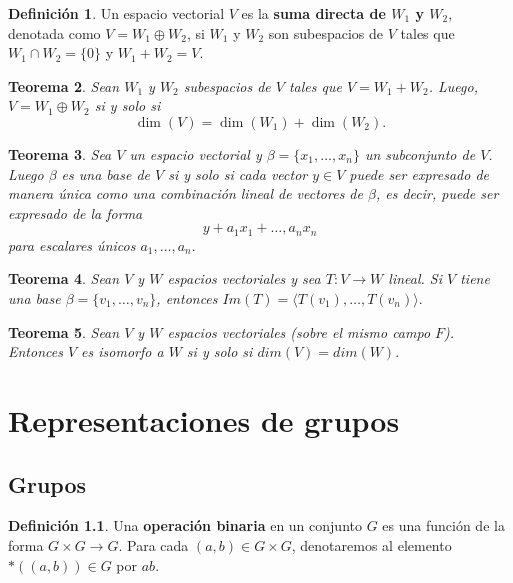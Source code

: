 \documentclass[12pt]{book}
\newtheorem{theorem}{Teorema}[section]
\theoremstyle{definition}
\newtheorem{definition}[theorem]{Definición}
\newcounter{in}
\newcounter{ini}
\begin{document}
{\begin{definition}
  Un espacio vectorial $V$ es la \textbf{suma directa de $W_{1}$ y
  $W_{2}$}, denotada como $V=W_{1}\oplus W_{2}$, si $W_{1}$ y $W_{2}$
son subespacios de $V$ tales que $W_{1}\cap W_{2}=\{0\}$ y $W_{1}+W_{2}=V.$ 
\end{definition}

\begin{theorem}
  \label{esp-isomorfos}
  Sean $W_{1}$ y $W_{2}$ subespacios de $V$ tales que
  $V=W_{1}+W_{2}$. Luego, $V=W_{1}\oplus W_{2}$ si y solo si 
  $$\dim(V)=\dim(W_{1})+\dim(W_{2}).$$
\end{theorem}

\begin{theorem}
  \label{clunica}
  Sea $V$ un espacio vectorial y $\beta=\{x_{1},\dots,x_{n}\}$ un
  subconjunto de $V$. Luego $\beta$ es una base de $V$ si y solo si
  cada vector $y\in V$ puede ser expresado de manera única como una
  combinación lineal de vectores de $\beta$, es decir, puede ser
  expresado de la forma
  $$y+a_{1}x_{1}+\ldots,a_{n}x_{n}$$
  para escalares únicos $a_{1},\ldots,a_{n}.$
\end{theorem}

\begin{theorem}
  \label{imT}
  Sean $V$ y $W$ espacios vectoriales y sea $T:V \rightarrow W$
  lineal. Si $V$ tiene una base $\beta=\{v_{1},\ldots,v_{n}\}$,
  entonces $Im(T)=\langle T(v_{1}),\ldots,T(v_{n})\rangle.$  
\end{theorem}

\begin{theorem}
  Sean $V$ y $W$ espacios vectoriales (sobre el mismo campo
  $F$). Entonces $V$ es isomorfo a $W$ si y solo si $dim (V)=dim(W).$ 
\end{theorem}

\chapter{Representaciones de grupos}
\label{cha:primer-capitulo}

\section{Grupos}

\begin{definition}
  Una \textbf{operación binaria} en un conjunto $G$ es una función
  de la forma $G  \times G \rightarrow G$. Para cada $(a,b)\in G
  \times G$, denotaremos al elemento $*((a,b))\in G$ por $ab$. 
\end{definition} 

}
\end{document}
